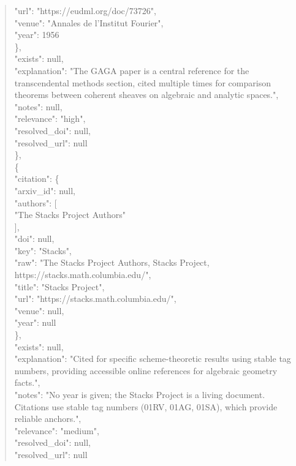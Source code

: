 \documentclass[11pt]{article}
\begin{document}
\begin{quote}
        "url": "https://eudml.org/doc/73726",\\
        "venue": "Annales de l'Institut Fourier",\\
        "year": 1956\\
      \},\\
      "exists": null,\\
      "explanation": "The GAGA paper is a central reference for the transcendental methods section, cited multiple times for comparison theorems between coherent sheaves on algebraic and analytic spaces.",\\
      "notes": null,\\
      "relevance": "high",\\
      "resolved\_doi": null,\\
      "resolved\_url": null\\
    \},\\
    \{\\
      "citation": \{\\
        "arxiv\_id": null,\\
        "authors": [\\
          "The Stacks Project Authors"\\
        ],\\
        "doi": null,\\
        "key": "Stacks",\\
        "raw": "The Stacks Project Authors, Stacks Project, https://stacks.math.columbia.edu/",\\
        "title": "Stacks Project",\\
        "url": "https://stacks.math.columbia.edu/",\\
        "venue": null,\\
        "year": null\\
      \},\\
      "exists": null,\\
      "explanation": "Cited for specific scheme-theoretic results using stable tag numbers, providing accessible online references for algebraic geometry facts.",\\
      "notes": "No year is given; the Stacks Project is a living document. Citations use stable tag numbers (01RV, 01AG, 01SA), which provide reliable anchors.",\\
      "relevance": "medium",\\
      "resolved\_doi": null,\\
      "resolved\_url": null\\

\end{quote}
\end{document}
